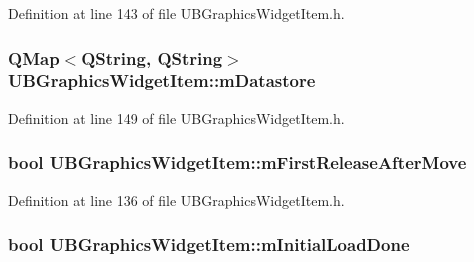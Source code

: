 Definition at line 143 of file U\-B\-Graphics\-Widget\-Item.\-h.

\hypertarget{class_u_b_graphics_widget_item_afcd938be72e65d4517c96df6841796f0}{
\subsubsection[{m\-Datastore}]{\setlength{\rightskip}{0pt plus 5cm}Q\-Map$<$Q\-String, Q\-String$>$ U\-B\-Graphics\-Widget\-Item\-::m\-Datastore\hspace{0.3cm}{\ttfamily [protected]}}}\label{d0/d16/class_u_b_graphics_widget_item_afcd938be72e65d4517c96df6841796f0}


Definition at line 149 of file U\-B\-Graphics\-Widget\-Item.\-h.

\hypertarget{class_u_b_graphics_widget_item_ad523ba7198b6e62fd6dc3928e8066d00}{
\subsubsection[{m\-First\-Release\-After\-Move}]{\setlength{\rightskip}{0pt plus 5cm}bool U\-B\-Graphics\-Widget\-Item\-::m\-First\-Release\-After\-Move\hspace{0.3cm}{\ttfamily [protected]}}}\label{d0/d16/class_u_b_graphics_widget_item_ad523ba7198b6e62fd6dc3928e8066d00}


Definition at line 136 of file U\-B\-Graphics\-Widget\-Item.\-h.

\hypertarget{class_u_b_graphics_widget_item_a3b2df2c11c6c54109d409d3e3741e937}{
\subsubsection[{m\-Initial\-Load\-Done}]{\setlength{\rightskip}{0pt plus 5cm}bool U\-B\-Graphics\-Widget\-Item\-::m\-Initial\-Load\-Done\hspace{0.3cm}{\ttfamily [protected]}}}\label{d0/d16/class_u_b_graphics_widget_item_a3b2df2c11c6c54109d409d3e3741e937}


